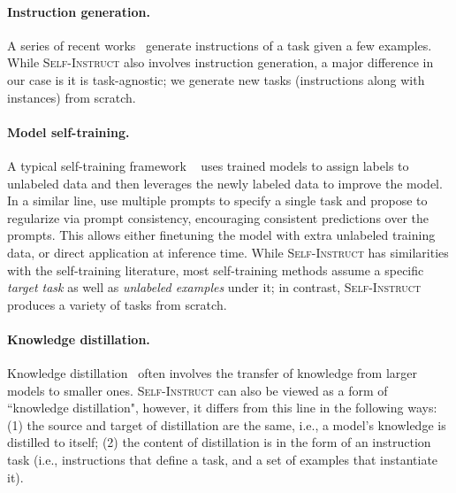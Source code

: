 \paragraph{Instruction generation.} A series of recent works~\cite{zhou2022large, ye2022guess, singh2022explaining, honovich2022instruction} generate instructions of a task given a few examples. While \textsc{Self-Instruct} also involves instruction generation, a major difference in our case is it is task-agnostic; we generate new tasks (instructions along with instances) from scratch.

\paragraph{Model self-training.} A typical self-training framework ~\cite{he2019revisiting, xie2020self, du2021self, amini2022self, huang2022large} uses trained models to assign labels to unlabeled data and then leverages the newly labeled data to improve the model. In a similar line, \citet {zhou2022prompt} use multiple prompts to specify a single task and propose to regularize via prompt consistency, encouraging consistent predictions over the prompts. This allows either finetuning the model  with extra unlabeled training data, or direct application at inference time. While \textsc{Self-Instruct} has similarities with the self-training literature, most self-training methods assume a specific \textit{target task} as well as \textit{unlabeled examples} under it; in contrast, \textsc{Self-Instruct} produces a variety of tasks from scratch.

\paragraph{Knowledge distillation.} Knowledge distillation~\cite{hinton2015distilling,Sanh2019DistilBERTAD, west2021symbolic,luciecharlotte2022teachingsmallmodels} often involves the transfer of knowledge from larger models to smaller ones. \textsc{Self-Instruct} can also be viewed as a form of ``knowledge distillation", however, it differs from this line in the following ways: (1) the source and target of distillation are the same, i.e., a model's knowledge is distilled to itself; (2) the content of distillation is in the form of an instruction task (i.e., instructions that define a task, and a set of examples that instantiate it).

